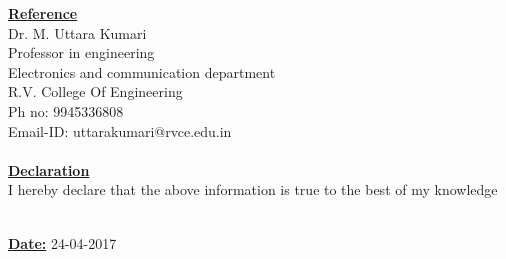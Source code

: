 \documentclass[10pt]{article}
\begin{document}
	\hfill
	
	\underline{\textbf{\Large{Reference}}}\\

	Dr. M. Uttara Kumari \\
	Professor in engineering \\
	Electronics and communication department \\
	R.V. College Of Engineering \\
	Ph no: 9945336808 \\
	Email-ID: uttarakumari@rvce.edu.in \\
	
	\hfill\\
	
	\underline{\textbf{\Large{Declaration}}} \\
	
	I hereby declare that the above information is true to the best of my knowledge
	
	\hfill\\
	
	\underline{\textbf{\large{Date:}}}  24-04-2017
		\hfill\\
\end{document}
